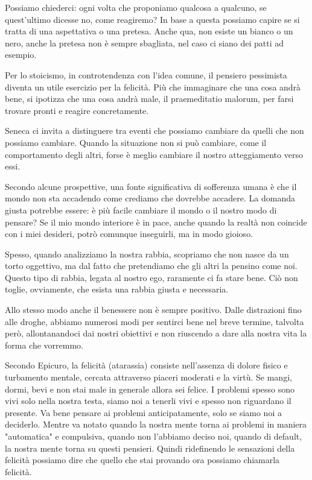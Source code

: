 \documentclass[12pt]{book} %
\begin{document}
Possiamo chiederci: ogni volta che proponiamo qualcosa a qualcuno, se quest'ultimo dicesse no, come reagiremo? In base a
questa possiamo capire se si tratta di una aspettativa o una pretesa. Anche qua, non esiste un bianco o un nero, anche
la pretesa non è sempre sbagliata, nel caso ci siano dei patti ad esempio.

Per lo stoicismo, in controtendenza con l'idea comune, il pensiero pessimista diventa un utile
esercizio per la felicità. Più che immaginare che una cosa andrà bene, si ipotizza che una cosa andrà male, il praemeditatio malorum, per farsi
trovare pronti e reagire concretamente. 

Seneca ci invita a distinguere tra eventi che possiamo cambiare da quelli che non possiamo cambiare. Quando la situazione non si può cambiare, come il comportamento degli altri, forse è meglio cambiare il nostro atteggiamento verso essi.

Secondo alcune prospettive, una fonte significativa di sofferenza umana è che il mondo non sta accadendo come crediamo che dovrebbe accadere. La domanda giusta potrebbe essere: è più facile cambiare il mondo o il nostro modo di pensare? Se il mio mondo interiore è in pace, anche quando la realtà non coincide con i miei desideri, potrò comunque inseguirli, ma in modo gioioso.

Spesso, quando analizziamo la nostra rabbia, scopriamo che non nasce da un torto oggettivo, ma dal fatto che pretendiamo che gli altri la pensino come noi. Questo tipo di rabbia, legata al nostro ego, raramente ci fa stare bene. Ciò non toglie, ovviamente, che esista una rabbia giusta e necessaria.

Allo stesso modo anche il benessere non è sempre positivo. Dalle distrazioni fino alle droghe, abbiamo numerosi modi per sentirci bene nel breve termine, talvolta però, allontanandoci dai nostri obiettivi e non riuscendo a dare alla nostra vita la forma che vorremmo. 

Secondo Epicuro, la felicità (atarassia) consiste nell’assenza di dolore fisico e turbamento mentale, cercata attraverso piaceri moderati e la virtù. Se mangi, dormi, bevi e non stai male in generale allora sei felice. I problemi spesso sono vivi solo nella nostra testa, siamo noi a tenerli vivi e spesso non riguardano il presente. Va bene pensare ai problemi anticipatamente, solo se siamo noi a deciderlo. Mentre va notato quando la nostra mente torna ai problemi in maniera "automatica" e compulsiva, quando non l'abbiamo deciso noi, quando di default, la nostra mente torna su questi pensieri.
Quindi ridefinendo le sensazioni della felicità possiamo dire che quello che stai provando ora possiamo chiamarla felicità. 
\end{document}
